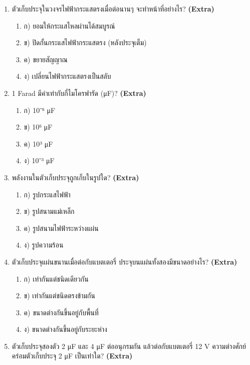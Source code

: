 \documentclass[12pt]{article}
\begin{document}
\begin{enumerate}[label=\arabic*.]
\begin{enumerate}[label=)]
\item ก) CV/2
\item ข) CV
\item ค) 2CV
\item ง) V/(2C)
\end{enumerate}
\item ตัวเก็บประจุในวงจรไฟฟ้ากระแสตรงเมื่อต่อนานๆ จะทำหน้าที่อย่างไร? \hfill \textbf{\small (Extra)}
\begin{enumerate}[label=)]
\item ก) ยอมให้กระแสไหลผ่านได้สมบูรณ์
\item ข) ปิดกั้นกระแสไฟฟ้ากระแสตรง (หลังประจุเต็ม)
\item ค) ขยายสัญญาณ
\item ง) เปลี่ยนไฟฟ้ากระแสตรงเป็นสลับ
\end{enumerate}
\item 1 Farad มีค่าเท่ากับกี่ไมโครฟารัด (μF)? \hfill \textbf{\small (Extra)}
\begin{enumerate}[label=)]
\item ก) 10⁻⁶ μF
\item ข) 10⁶ μF
\item ค) 10³ μF
\item ง) 10⁻³ μF
\end{enumerate}
\item พลังงานในตัวเก็บประจุถูกเก็บในรูปใด? \hfill \textbf{\small (Extra)}
\begin{enumerate}[label=)]
\item ก) รูปกระแสไฟฟ้า
\item ข) รูปสนามแม่เหล็ก
\item ค) รูปสนามไฟฟ้าระหว่างแผ่น
\item ง) รูปความร้อน
\end{enumerate}
\item ตัวเก็บประจุแผ่นขนานเมื่อต่อกับแบตเตอรี่ ประจุบนแผ่นทั้งสองมีขนาดอย่างไร? \hfill \textbf{\small (Extra)}
\begin{enumerate}[label=)]
\item ก) เท่ากันแต่ชนิดเดียวกัน
\item ข) เท่ากันแต่ชนิดตรงข้ามกัน
\item ค) ขนาดต่างกันขึ้นอยู่กับพื้นที่
\item ง) ขนาดต่างกันขึ้นอยู่กับระยะห่าง
\end{enumerate}
\item ตัวเก็บประจุสองตัว 2 μF และ 4 μF ต่ออนุกรมกัน แล้วต่อกับแบตเตอรี่ 12 V ความต่างศักย์คร่อมตัวเก็บประจุ 2 μF เป็นเท่าใด? \hfill \textbf{\small (Extra)}

\end{enumerate}
\end{document}
